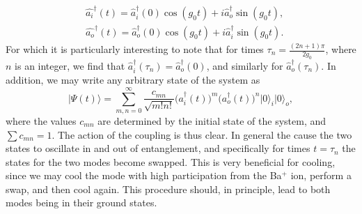 \begin{align}
    &\hat{a_i}^\dagger(t) = \hat{a}_i^\dagger(0)\cos(g_0t) + i\hat{a}_o^\dagger\sin(g_0t),\\
    &\hat{a_o}^\dagger(t) = \hat{a}_o^\dagger(0)\cos(g_0t) + i\hat{a}_i^\dagger\sin(g_0t).
\end{align}
For which it is particularly interesting to note that for times $\tau_n = \frac{(2n+1)\pi}{2g_0}$, where $n$ is an integer, we find that $\hat{a}_i^\dagger(\tau_n) = \hat{a}_o^\dagger(0)$, and similarly for $\hat{a}_o^\dagger(\tau_n)$. In addition, we may write any arbitrary state of the system as
\begin{equation}
    \vert \Psi(t)\rangle = \sum_{m,n = 0}^\infty \frac{c_{mn}}{\sqrt{m!n!}}\big(a_i^\dagger(t)\big)^m\big(a_o^\dagger(t)\big)^n\vert 0\rangle_i\vert 0\rangle_o,
\end{equation}
where the values $c_{mn}$ are determined by the initial state of the system, and $\sum c_{mn} =1$.
The action of the coupling is thus clear. In general the cause the two states to oscillate in and out of entanglement, and specifically for times $t = \tau_n$ the states for the two modes become swapped.
This is very beneficial for cooling, since we may cool the mode with high participation from the Ba$^+$ ion, perform a swap, and then cool again. This procedure should, in principle, lead to both modes being in their ground states.


